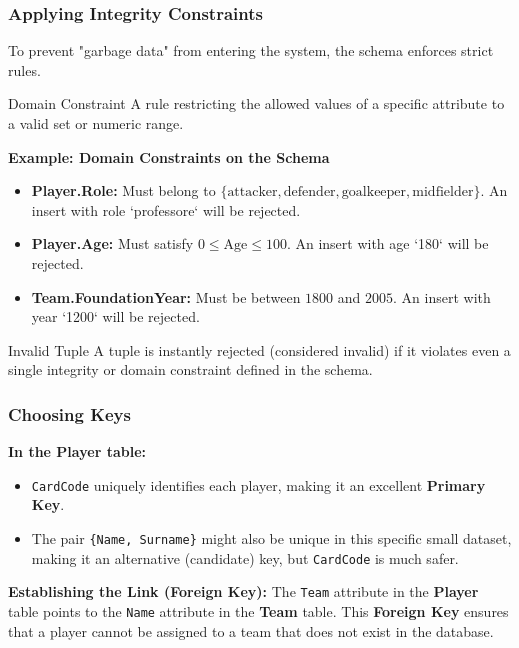 \subsubsection{Applying Integrity Constraints}
To prevent "garbage data" from entering the system, the schema enforces strict rules.

\begin{defbox}{Domain Constraint}
A rule restricting the allowed values of a specific attribute to a valid set or numeric range.
\end{defbox}

\vspace{0.2cm}
\begin{example}{\textbf{Example: Domain Constraints on the Schema}}
\begin{itemize}
    \item \textbf{Player.Role:} Must belong to $\{\text{attacker}, \text{defender}, \text{goalkeeper}, \text{midfielder}\}$. An insert with role `professore` will be rejected.
    \item \textbf{Player.Age:} Must satisfy $0 \leq \text{Age} \leq 100$. An insert with age `180` will be rejected.
    \item \textbf{Team.FoundationYear:} Must be between $1800$ and $2005$. An insert with year `1200` will be rejected.
\end{itemize}
\end{example}

\begin{defbox}{Invalid Tuple}
A tuple is instantly rejected (considered invalid) if it violates even a single integrity or domain constraint defined in the schema.
\end{defbox}

\subsubsection{Choosing Keys}
\textbf{In the Player table:}
\begin{itemize}
    \item \texttt{CardCode} uniquely identifies each player, making it an excellent \textbf{Primary Key}.
    \item The pair \texttt{\{Name, Surname\}} might also be unique in this specific small dataset, making it an alternative (candidate) key, but \texttt{CardCode} is much safer.
\end{itemize}

\textbf{Establishing the Link (Foreign Key):}
The \texttt{Team} attribute in the \textbf{Player} table points to the \texttt{Name} attribute in the \textbf{Team} table. This \textbf{Foreign Key} ensures that a player cannot be assigned to a team that does not exist in the database.


